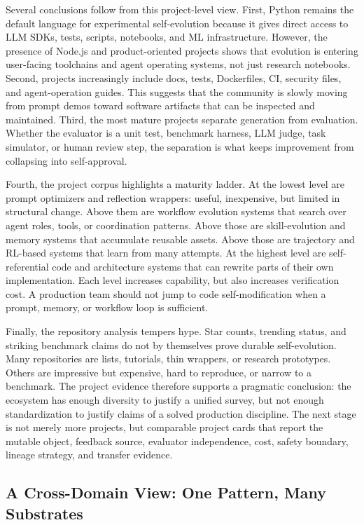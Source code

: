 Several conclusions follow from this project-level view. First, Python remains the default language for experimental self-evolution because it gives direct access to LLM SDKs, tests, scripts, notebooks, and ML infrastructure. However, the presence of Node.js and product-oriented projects shows that evolution is entering user-facing toolchains and agent operating systems, not just research notebooks. Second, projects increasingly include docs, tests, Dockerfiles, CI, security files, and agent-operation guides. This suggests that the community is slowly moving from prompt demos toward software artifacts that can be inspected and maintained. Third, the most mature projects separate generation from evaluation. Whether the evaluator is a unit test, benchmark harness, LLM judge, task simulator, or human review step, the separation is what keeps improvement from collapsing into self-approval.

Fourth, the project corpus highlights a maturity ladder. At the lowest level are prompt optimizers and reflection wrappers: useful, inexpensive, but limited in structural change. Above them are workflow evolution systems that search over agent roles, tools, or coordination patterns. Above those are skill-evolution and memory systems that accumulate reusable assets. Above those are trajectory and RL-based systems that learn from many attempts. At the highest level are self-referential code and architecture systems that can rewrite parts of their own implementation. Each level increases capability, but also increases verification cost. A production team should not jump to code self-modification when a prompt, memory, or workflow loop is sufficient.

Finally, the repository analysis tempers hype. Star counts, trending status, and striking benchmark claims do not by themselves prove durable self-evolution. Many repositories are lists, tutorials, thin wrappers, or research prototypes. Others are impressive but expensive, hard to reproduce, or narrow to a benchmark. The project evidence therefore supports a pragmatic conclusion: the ecosystem has enough diversity to justify a unified survey, but not enough standardization to justify claims of a solved production discipline. The next stage is not merely more projects, but comparable project cards that report the mutable object, feedback source, evaluator independence, cost, safety boundary, lineage strategy, and transfer evidence.

\subsection{A Cross-Domain View: One Pattern, Many Substrates}

